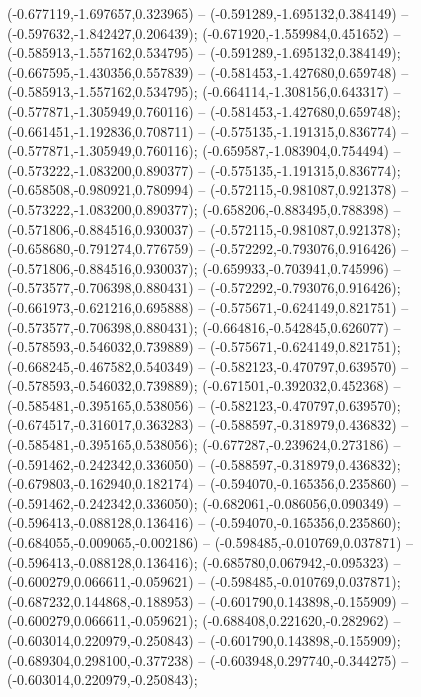  (-0.677119,-1.697657,0.323965) -- (-0.591289,-1.695132,0.384149) -- (-0.597632,-1.842427,0.206439);
 (-0.671920,-1.559984,0.451652) -- (-0.585913,-1.557162,0.534795) -- (-0.591289,-1.695132,0.384149);
 (-0.667595,-1.430356,0.557839) -- (-0.581453,-1.427680,0.659748) -- (-0.585913,-1.557162,0.534795);
 (-0.664114,-1.308156,0.643317) -- (-0.577871,-1.305949,0.760116) -- (-0.581453,-1.427680,0.659748);
 (-0.661451,-1.192836,0.708711) -- (-0.575135,-1.191315,0.836774) -- (-0.577871,-1.305949,0.760116);
 (-0.659587,-1.083904,0.754494) -- (-0.573222,-1.083200,0.890377) -- (-0.575135,-1.191315,0.836774);
 (-0.658508,-0.980921,0.780994) -- (-0.572115,-0.981087,0.921378) -- (-0.573222,-1.083200,0.890377);
 (-0.658206,-0.883495,0.788398) -- (-0.571806,-0.884516,0.930037) -- (-0.572115,-0.981087,0.921378);
 (-0.658680,-0.791274,0.776759) -- (-0.572292,-0.793076,0.916426) -- (-0.571806,-0.884516,0.930037);
 (-0.659933,-0.703941,0.745996) -- (-0.573577,-0.706398,0.880431) -- (-0.572292,-0.793076,0.916426);
 (-0.661973,-0.621216,0.695888) -- (-0.575671,-0.624149,0.821751) -- (-0.573577,-0.706398,0.880431);
 (-0.664816,-0.542845,0.626077) -- (-0.578593,-0.546032,0.739889) -- (-0.575671,-0.624149,0.821751);
 (-0.668245,-0.467582,0.540349) -- (-0.582123,-0.470797,0.639570) -- (-0.578593,-0.546032,0.739889);
 (-0.671501,-0.392032,0.452368) -- (-0.585481,-0.395165,0.538056) -- (-0.582123,-0.470797,0.639570);
 (-0.674517,-0.316017,0.363283) -- (-0.588597,-0.318979,0.436832) -- (-0.585481,-0.395165,0.538056);
 (-0.677287,-0.239624,0.273186) -- (-0.591462,-0.242342,0.336050) -- (-0.588597,-0.318979,0.436832);
 (-0.679803,-0.162940,0.182174) -- (-0.594070,-0.165356,0.235860) -- (-0.591462,-0.242342,0.336050);
 (-0.682061,-0.086056,0.090349) -- (-0.596413,-0.088128,0.136416) -- (-0.594070,-0.165356,0.235860);
 (-0.684055,-0.009065,-0.002186) -- (-0.598485,-0.010769,0.037871) -- (-0.596413,-0.088128,0.136416);
 (-0.685780,0.067942,-0.095323) -- (-0.600279,0.066611,-0.059621) -- (-0.598485,-0.010769,0.037871);
 (-0.687232,0.144868,-0.188953) -- (-0.601790,0.143898,-0.155909) -- (-0.600279,0.066611,-0.059621);
 (-0.688408,0.221620,-0.282962) -- (-0.603014,0.220979,-0.250843) -- (-0.601790,0.143898,-0.155909);
 (-0.689304,0.298100,-0.377238) -- (-0.603948,0.297740,-0.344275) -- (-0.603014,0.220979,-0.250843);
